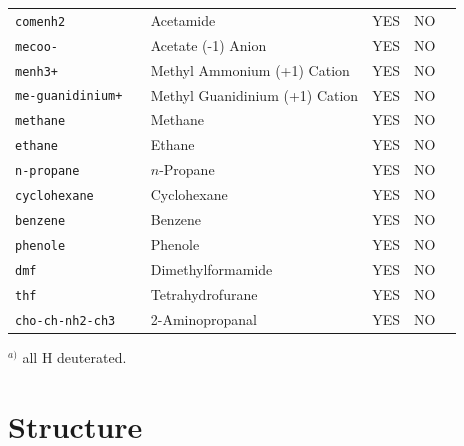 \documentclass[a4paper,titlepage,twoside,fleqn,12pt]{book}
\begin{document}
\begin{refsection}
\begin{table}[t!]
\begin{tabular*}{1.0\textwidth}{@{\extracolsep{\fill} } lllll}
 \tt{comenh2         } & Acetamide                       & YES  &   NO     &                                          \\
 \tt{mecoo-          } & Acetate (-1) Anion              & YES  &   NO     &                                          \\
 \tt{menh3+          } & Methyl Ammonium (+1) Cation     & YES  &   NO     &                                          \\
 \tt{me-guanidinium+ } & Methyl Guanidinium (+1) Cation  & YES  &   NO     &                                          \\
 \tt{methane         } & Methane                         & YES  &   NO     &                                          \\
 \tt{ethane          } & Ethane                          & YES  &   NO     &                                          \\
 \tt{n-propane       } & $n$-Propane                     & YES  &   NO     &                                          \\
 \tt{cyclohexane     } & Cyclohexane                     & YES  &   NO     &                                          \\
 \tt{benzene         } & Benzene                         & YES  &   NO     &                                          \\
 \tt{phenole         } & Phenole                         & YES  &   NO     &                                          \\
 \tt{dmf             } & Dimethylformamide               & YES  &   NO     &                                          \\
 \tt{thf             } & Tetrahydrofurane                & YES  &   NO     &                                          \\
 \tt{cho-ch-nh2-ch3  } & 2-Aminopropanal                 & YES  &   NO     &                                          \\
\hline\hline
\end{tabular*}
%
\begin{footnotesize}
$^{a)}$ all H deuterated.
\end{footnotesize}
\end{table}
%



\section{Structure}


\end{refsection}
\end{document}
